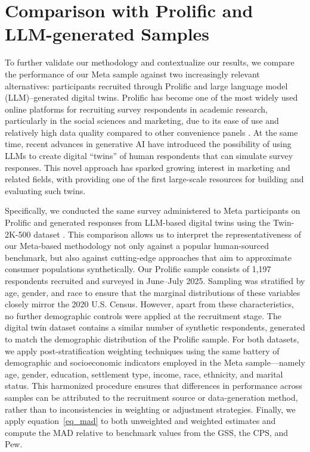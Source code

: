 \section{Comparison with Prolific and LLM-generated Samples}

To further validate our methodology and contextualize our results, we compare the performance of our Meta sample against two increasingly relevant alternatives: participants recruited through Prolific and large language model (LLM)–generated digital twins. Prolific has become one of the most widely used online platforms for recruiting survey respondents in academic research, particularly in the social sciences and marketing, due to its ease of use and relatively high data quality compared to other convenience panels \citep{palan2018prolific}. At the same time, recent advances in generative AI have introduced the possibility of using LLMs to create digital ``twins'' of human respondents that can simulate survey responses. This novel approach has sparked growing interest in marketing and related fields, with \citet{toubia2025twin} providing one of the first large-scale resources for building and evaluating such twins. 

Specifically, we conducted the same survey administered to Meta participants on Prolific and generated responses from LLM-based digital twins using the Twin-2K-500 dataset \citep{toubia2025twin}. This comparison allows us to interpret the representativeness of our Meta-based methodology not only against a popular human-sourced benchmark, but also against cutting-edge approaches that aim to approximate consumer populations synthetically.
Our Prolific sample consists of 1,197 respondents recruited and surveyed in June–July 2025. Sampling was stratified by age, gender, and race to ensure that the marginal distributions of these variables closely mirror the 2020 U.S. Census. However, apart from these characteristics, no further demographic controls were applied at the recruitment stage. The digital twin dataset contains a similar number of synthetic respondents, generated to match the demographic distribution of the Prolific sample. For both datasets, we apply post-stratification weighting techniques using the same battery of demographic and socioeconomic indicators employed in the Meta sample—namely age, gender, education, settlement type, income, race, ethnicity, and marital status. This harmonized procedure ensures that differences in performance across samples can be attributed to the recruitment source or data-generation method, rather than to inconsistencies in weighting or adjustment strategies. Finally, we apply equation~\eqref{eq_mad} to both unweighted and weighted estimates and compute the MAD relative to benchmark values from the GSS, the CPS, and Pew.

